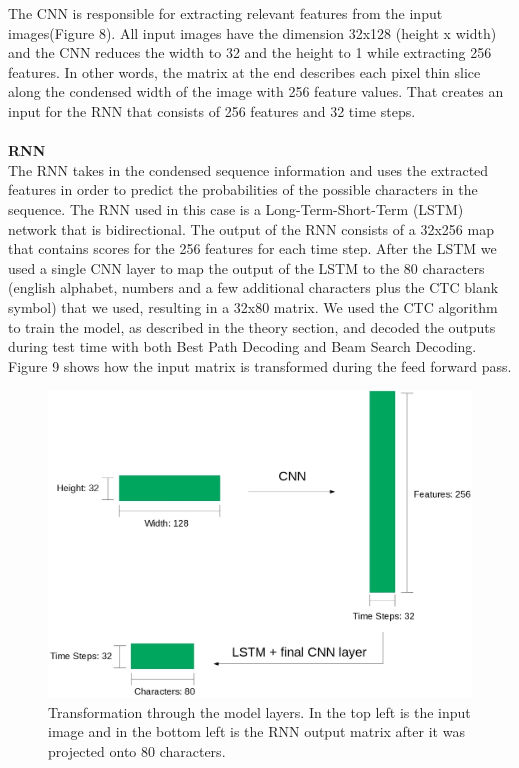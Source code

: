 \documentclass{article}
\begin{document}
The CNN is responsible for extracting relevant features from the input images(Figure 8). All input images have the dimension 32x128 (height x width) and the CNN reduces the width to 32 and the height to 1 while extracting 256 features. In other words, the matrix at the end describes each pixel thin slice along the condensed width of the image with 256 feature values. That creates an input for the RNN that consists of 256 features and 32 time steps.\\\\
\textbf{RNN}\\
The RNN takes in the condensed sequence information and uses the extracted features in order to predict the probabilities of the possible characters in the sequence. The RNN used in this case is a Long-Term-Short-Term (LSTM) network that is bidirectional. The output of the RNN consists of a 32x256 map that contains scores for the 256 features for each time step. After the LSTM we used a single CNN layer to map the output of the LSTM to the 80 characters (english alphabet, numbers and a few additional characters plus the CTC blank symbol) that we used, resulting in a 32x80 matrix. We used the CTC algorithm to train the model, as described in the theory section, and decoded the outputs during test time with both Best Path Decoding and Beam Search Decoding. Figure 9 shows how the input matrix is transformed during the feed forward pass.
\begin{figure}[H]
\begin{center}
\includegraphics[scale=0.25]{rsz_pipeline}
\end{center}
\caption{Transformation through the model layers. In the top left is the input image and in the bottom left is the RNN output matrix after it was projected onto 80 characters.}
\end{figure}
\end{document}
